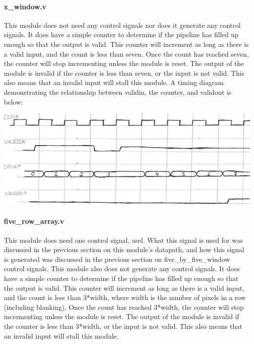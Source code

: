 \documentclass[12pt]{article}
\begin{document}
\paragraph{x\_window.v}
This module does not need any control signals nor does it generate any control 
signals. It does have a simple counter to determine if the pipeline has filled 
up enough so that the output is valid. This counter will increment as long as 
there is a valid input, and the count is less than seven. Once the count has 
reached seven, the counter will stop incrementing unless the module is reset. 
The output of the module is invalid if the counter is less than seven, or the 
input is not valid. This also means that an invalid input will stall this 
module. A timing diagram demonstrating the relationship between validin, the 
counter, and validout is below:

\includegraphics[width=\textwidth]{processed_image_pngs/timing_1.png}

\paragraph{five\_row\_array.v}
This module does need one control signal, asel. What this signal is used for was discussed in the previous section on this module's datapath, and how this signal is generated was discussed in the previous section on five\_by\_five\_window control signals. This module also does not generate any control signals. It does have a simple counter to determine if the pipeline has filled up enough so that the output is valid. This counter will increment as long as there is a valid input, and the count is less than 3*width, where width is the number of pixels in a row (including blanking). Once the count has reached 3*width, the counter will stop incrementing unless the module is reset. The output of the module is invalid if the counter is less than 3*width, or the input is not valid. This also means that an invalid input will stall this module.
\end{document}
